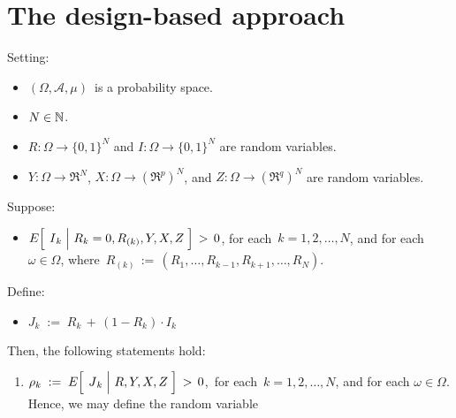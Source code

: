 

\section{The design-based approach}
\setcounter{theorem}{0}
\setcounter{equation}{0}


\renewcommand{\theenumi}{\roman{enumi}}
\renewcommand{\labelenumi}{\textnormal{(\theenumi)}$\;\;$}



\begin{proposition}
\mbox{}
\vskip 0.1cm
\noindent
Setting:
\begin{itemize}
\item
	$(\Omega,\mathcal{A},\mu)$\, is a probability space.
\item
	$N \in \mathbb{N}$.
\item
	$R : \Omega \longrightarrow \{0,1\}^{N}$\; and
	$I : \Omega \longrightarrow \{0,1\}^{N}$
	are random variables.
\item
	$Y : \Omega \longrightarrow \Re^{N}$,\;
	$X : \Omega \longrightarrow (\Re^{p})^{N}$,\; and\;
	$Z : \Omega \longrightarrow (\Re^{q})^{N}$
	are random variables.
\end{itemize}
Suppose:
\begin{itemize}
\item
	$E\!\left[\;\left.\overset{{\color{white}.}}{I}_{k}\;\right\vert\,R_{k}=0,R_{(k)},Y,X,Z\;\right] \, > \, 0$,\;
	for each \,$k = 1, 2, \ldots, N$, and for each $\omega \in \Omega$,
	\vskip 0.05cm
	where \,$R_{(k)} \, := \, (R_{1},\ldots,R_{k-1},R_{k+1},\ldots,R_{N})$.
\end{itemize}
\vskip 0.3cm
\noindent
Define:
\begin{itemize}
\item
	$J_{k} \; := \; R_{k} \, + \, (1-R_{k}) \cdot I_{k}$
\end{itemize}
\vskip 0.3cm
\noindent
Then, the following statements hold:
\begin{enumerate}
\item
	$\rho_{k} \; := \; E\!\left[\;\left.\overset{{\color{white}.}}{J}_{k}\;\right\vert\,R,Y,X,Z\;\right] \, > \, 0$,\,
	for each \,$k = 1, 2, \ldots, N$, and for each $\omega \in \Omega$.
	\vskip 0.05cm
	\noindent
	Hence, we may define the random variable

\end{enumerate}
\end{proposition}
